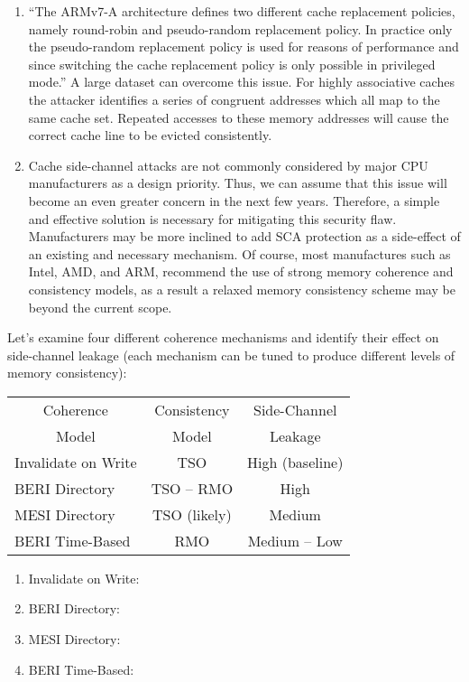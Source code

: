\begin{enumerate}
	\item ``The ARMv7-A architecture defines two different cache replacement policies, namely round-robin and pseudo-random replacement policy. In practice only the pseudo-random replacement policy is used for reasons of performance and since switching the cache replacement policy is only possible in privileged mode.'' A large dataset can overcome this issue. For highly associative caches the attacker identifies a series of congruent addresses which all map to the same cache set. Repeated accesses to these memory addresses will cause the correct cache line to be evicted consistently.
	\item Cache side-channel attacks are not commonly considered by major CPU manufacturers as a design priority. Thus, we can assume that this issue will become an even greater concern in the next few years. Therefore, a simple and effective solution is necessary for mitigating this security flaw. Manufacturers may be more inclined to add SCA protection as a side-effect of an existing and necessary mechanism. Of course, most manufactures such as Intel, AMD, and ARM, recommend the use of strong memory coherence and consistency models, as a result a relaxed memory consistency scheme may be beyond the current scope.
	\end{enumerate}
	
	Let's examine four different coherence mechanisms and identify their effect on side-channel leakage (each mechanism can be tuned to produce different levels of memory consistency):
	
	\begin{table}[h]
	\begin{center}
	\begin{tabular}[c]{|l|c|c|}
		\hline
		\multicolumn{1}{|c|}{Coherence} & Consistency & Side-Channel \\
		\multicolumn{1}{|c|}{Model} & Model & Leakage \\
		\hline
		Invalidate on Write & TSO & High (baseline) \\
		BERI Directory & TSO -- RMO & High \\
		MESI Directory & TSO (likely) & Medium \\
		BERI Time-Based & RMO & Medium -- Low \\
		\hline
	\end{tabular}
	\end{center}
	\end{table}
	
	\begin{enumerate}
		\item Invalidate on Write: 
		\item BERI Directory:
		\item MESI Directory:
		\item BERI Time-Based:
	\end{enumerate}




